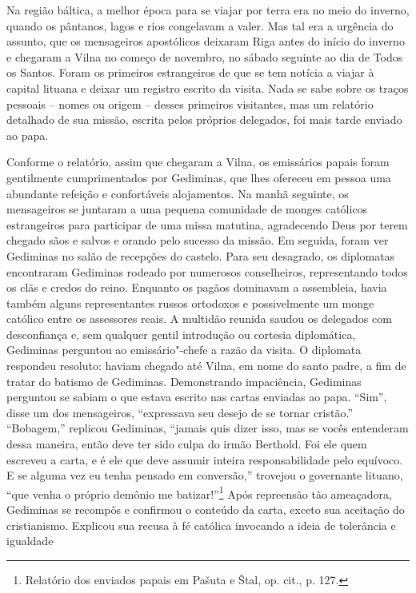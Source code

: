 Na região báltica, a melhor época para se viajar por terra era no meio
do inverno, quando os pântanos, lagos e rios congelavam a valer. Mas tal
era a urgência do assunto, que os mensageiros apostólicos deixaram Riga
antes do início do inverno e chegaram a Vilna no começo de novembro, no
sábado seguinte ao dia de Todos os Santos. Foram os primeiros
estrangeiros de que se tem notícia a viajar à capital lituana e deixar
um registro escrito da visita. Nada se sabe sobre os traços pessoais --
nomes ou origem -- desses primeiros visitantes, mas um relatório
detalhado de sua missão, escrita pelos próprios delegados, foi mais
tarde enviado ao papa.

Conforme o relatório, assim que chegaram a Vilna, os emissários papais
foram gentilmente cumprimentados por Gediminas, que lhes ofereceu em
pessoa uma abundante refeição e confortáveis alojamentos. Na manhã
seguinte, os mensageiros se juntaram a uma pequena comunidade de monges
católicos estrangeiros para participar de uma missa matutina,
agradecendo Deus por terem chegado sãos e salvos e orando pelo sucesso
da missão. Em seguida, foram ver Gediminas no salão de recepções do
castelo. Para seu desagrado, os diplomatas encontraram Gediminas rodeado
por numerosos conselheiros, representando todos os clãs e credos do
reino. Enquanto os pagãos dominavam a assembleia, havia também alguns
representantes russos ortodoxos e possivelmente um monge católico entre
os assessores reais. A multidão reunida saudou os delegados com
desconfiança e, sem qualquer gentil introdução ou cortesia diplomática,
Gediminas perguntou ao emissário"-chefe a razão da visita. O diplomata
respondeu resoluto: haviam chegado até Vilna, em nome do santo padre, a
fim de tratar do batismo de Gediminas. Demonstrando impaciência,
Gediminas perguntou se sabiam o que estava escrito nas cartas enviadas
ao papa. ``Sim'', disse um dos mensageiros, ``expressava seu desejo de
se tornar cristão.'' ``Bobagem,'' replicou Gediminas, ``jamais quis
dizer isso, mas se vocês entenderam dessa maneira, então deve ter sido
culpa do irmão Berthold. Foi ele quem escreveu a carta, e é ele que deve
assumir inteira responsabilidade pelo equívoco. E se alguma vez eu tenha
pensado em conversão,'' trovejou o governante lituano, ``que venha o
próprio demônio me batizar!''\footnote{Relatório dos enviados papais em Pašuta e Štal, op. cit., p. 127.}
Após repreensão tão ameaçadora, Gediminas se recompôs e confirmou o
conteúdo da carta, exceto sua aceitação do cristianismo. Explicou sua
recusa à fé católica invocando a ideia de tolerância e igualdade
